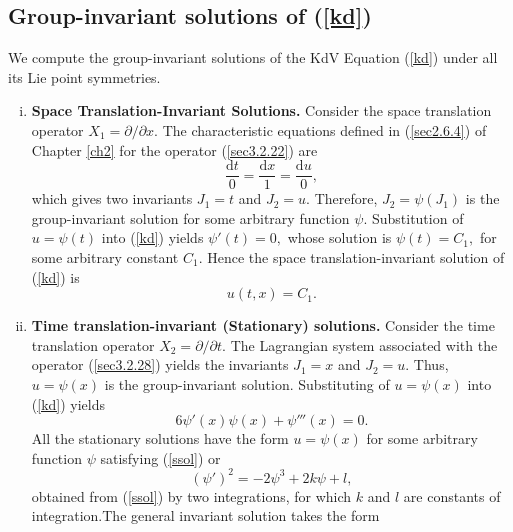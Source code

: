 \subsection{Group-invariant solutions of (\ref{kd})}
 We  compute the group-invariant solutions of the KdV Equation (\ref{kd}) under all its Lie point symmetries.
 \begin{enumerate}[(i)]
 \item \textbf{Space Translation-Invariant Solutions.} \newline
 Consider the space translation operator 
$ X_1 = \partial/ \partial x.$  The  characteristic equations defined in (\ref{sec2.6.4}) of Chapter \ref{ch2} for  the operator (\ref{sec3.2.22}) are \begin{equation} \frac{ \mathrm{d} t }{0 } = \frac{ \mathrm{d} x }{1 } = \frac{ \mathrm{d} u }{0 }, \label{sec3.2.23}
 \end{equation} which gives two invariants $ J_1 =t$ and $ J_2 = u$. Therefore, $J_2 = \psi(J_1) $  is the group-invariant solution for some arbitrary function $ \psi$. Substitution of $u=\psi(t)$ into (\ref{kd}) yields $
 \psi'(t) =0,$  whose solution is $ \psi(t) = C_1,$  for  some arbitrary constant $C_1$. Hence the space translation-invariant solution of (\ref{kd})  is \begin{equation}
u(t,x) = C_1. \label{sec3.2.27}
 \end{equation}
\item \textbf{Time translation-invariant (Stationary) solutions.} \newline
 Consider the time translation operator $X_2 =  \partial / \partial t .$  The Lagrangian system associated with the operator (\ref{sec3.2.28}) yields the invariants  $J_1 = x$ and $ J_2 = u$. 
Thus, $ u = \psi(x)$ is the group-invariant solution.
Substituting of $u= \psi(x)$ into (\ref{kd}) yields \begin{equation} 6 \psi'(x) \psi(x) + \psi'''(x)=0. \label{ssol}
\end{equation} All the stationary solutions have the form $ u =  \psi(x)$
 for some arbitrary function $ \psi$  satisfying (\ref{ssol}) or 
 \begin{equation}
(\psi')^2 = -2 \psi^3 + 2k \psi +l, \label{psi}
\end{equation} obtained from (\ref{ssol}) by two integrations, for which $ k $ and $l$ are constants of integration.\newline The general invariant solution takes the form \citep*{ibragimov1995crc} \begin{equation}

\end{equation}
\end{enumerate}
